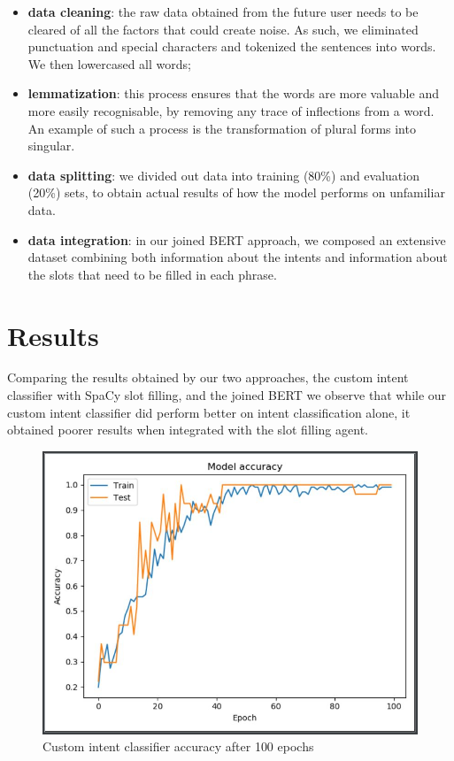\documentclass[runningheads,a4paper,11pt]{report}
\begin{document}
\begin{itemize}
	\item \textbf{data cleaning}: the raw data obtained from the future user needs to be cleared of all the factors that could create noise. As such, we eliminated punctuation and special characters and tokenized the sentences into words. We then lowercased all words;
	\item \textbf{lemmatization}: this process ensures that the words are more valuable and more easily recognisable, by removing any trace of inflections from a word. An example of such a process is the transformation of plural forms into singular.
	\item \textbf{data splitting}: we divided out data into training (80\%) and evaluation (20\%) sets, to obtain actual results of how the model performs on unfamiliar data.
	\item \textbf{data integration}: in our joined BERT approach, we composed an extensive dataset combining both information about the intents and information about the slots that need to be filled in each phrase.
\end{itemize}
 

\section{Results}
\label{section:results}

Comparing the results obtained by our two approaches, the custom intent classifier with SpaCy slot filling, and the joined BERT we observe that while our custom intent classifier did perform better on intent classification alone, it obtained poorer results when integrated with the slot filling agent.

\begin{figure}
\centerline{\includegraphics[width=12cm]{Img/m1acc.JPG}}  
	\caption{Custom intent classifier accuracy after 100 epochs}
	\label{accM1}
\end{figure}
\end{document}
